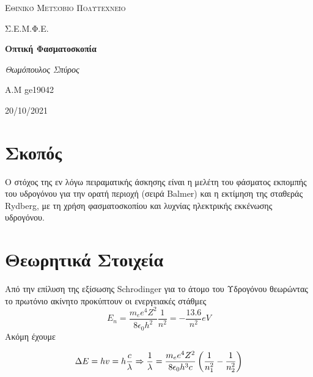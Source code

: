 \documentclass[a4paper]{article}
\begin{document}
\begin{titlepage}			%
	\centering
	{\scshape\LARGE Εθινικό Μετσόβιο Πολυτεχνείο\par}
	{\scshape \LARGE Σ.Ε.Μ.Φ.Ε.\par}
	\vspace{1cm}
	{\huge\bfseries Οπτική Φασματοσκοπία\par}
	\vspace{1cm}
	{\Large\itshape Θωμόπουλος Σπύρος\par}		%
	
	{\large A.M ge19042 \hfill \\}%
	\vspace{1cm}
	{\large 20/10/2021\par}
\end{titlepage}


\newpage 
\section*{Σκοπός}
Ο στόχος της εν λόγω πειραματικής άσκησης είναι η μελέτη του φάσματος εκπομπής του υδρογόνου για την ορατή περιοχή (σειρά Balmer) και η εκτίμηση της σταθεράς Rydberg, με τη χρήση φασματοσκοπίου και λυχνίας ηλεκτρικής εκκένωσης υδρογόνου.

\section*{Θεωρητικά Στοιχεία}
 Από την επίλυση της εξίσωσης Schrodinger για το άτομο του Υδρογόνου θεωρώντας το πρωτόνιο ακίνητο προκύπτουν οι ενεργειακές στάθμες 
 $$E_{n} = \frac{m_e e^4 Z^2}{8\epsilon_{0} h^2 }\frac{1}{n^2} = -\frac{13.6}{n^2} eV$$
 Ακόμη έχουμε 
 
 \begin{equation}\label{1}
 \Delta E = h v = h \frac{c}{\lambda} \Rightarrow  \\ 
 \frac{1}{\lambda} =\frac{m_e e^4 Z^2}{8 \epsilon_{0} h^3 c } \left( \frac{1}{n_{1}^2} -
 \frac{1}{n_{2}^2} \right)
 \end{equation}
 
\end{document}
